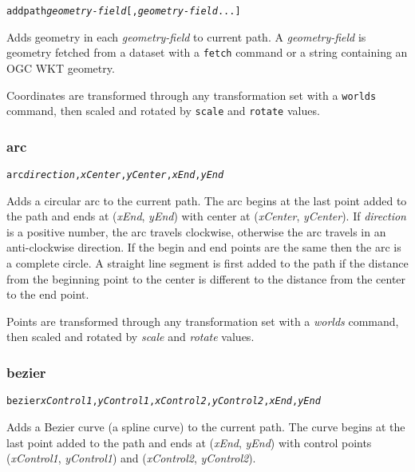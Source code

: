 \begin{alltt}
addpath \textit{geometry-field} [, \textit{geometry-field} ...]
\end{alltt}

Adds geometry in each \textit{geometry-field} to current path.
A \textit{geometry-field} is geometry fetched from a dataset
with a \texttt{fetch} command or a string containing an
OGC WKT geometry.

Coordinates are transformed through any
transformation set with a \texttt{worlds} command,
then scaled and rotated by \texttt{scale}
and \texttt{rotate} values.

\subsubsection{arc}

\begin{alltt}
arc \textit{direction}, \textit{xCenter}, \textit{yCenter}, \textit{xEnd}, \textit{yEnd}
\end{alltt}

Adds a circular arc to the current path.  The arc begins at
the last point added to the path and ends at (\textit{xEnd}, \textit{yEnd})
with center at (\textit{xCenter}, \textit{yCenter}).
If \textit{direction} is a positive number, the arc travels clockwise,
otherwise the arc travels in an anti-clockwise direction.
If the begin and end points are the same then the arc is a complete circle.
A straight line segment is first added to the path if
the distance from the beginning point to the center is different
to the distance from the center to the end point.

Points are transformed through any
transformation set with a \textit{worlds} command,
then scaled and rotated by \textit{scale}
and \textit{rotate} values.

\subsubsection{bezier}

\begin{alltt}
bezier \textit{xControl1}, \textit{yControl1}, \textit{xControl2}, \textit{yControl2}, \textit{xEnd}, \textit{yEnd}
\end{alltt}

Adds a Bezier curve (a spline curve) to the current path.  The curve begins at
the last point added to the path and ends at (\textit{xEnd}, \textit{yEnd})
with control points (\textit{xControl1}, \textit{yControl1}) and
(\textit{xControl2}, \textit{yControl2}).

